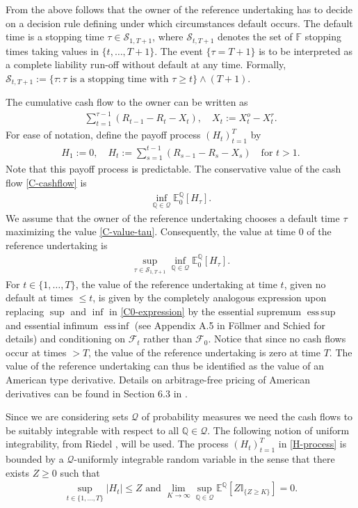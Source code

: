 \documentclass[11pt,a4paper]{article}
\newcommand{\E}{\mathbb{E}}
\DeclareMathOperator*{\esssup}{ess\,sup}
\DeclareMathOperator*{\essinf}{ess\,inf}
\newcommand{\Q}{\mathbb{Q}}
\newcommand{\calF}{\mathcal{F}}
\newcommand{\filF}{\mathbb{F}}
\newcommand{\calS}{\mathcal{S}}
\newcommand{\calQ}{\mathcal{Q}}
\newcommand{\indic}{\mathbb{I}}
\begin{document}
From the above follows that the owner of the reference undertaking has to decide on a decision rule defining under which circumstances default occurs. The default time is a stopping time $\tau \in \calS_{1,T+1}$, where $\calS_{t,T+1}$ denotes the set of $\filF$ stopping times taking values in $\{t,\dots,T+1\}$. The event $\{\tau=T+1\}$ is to be interpreted as a complete liability run-off without default at any time. Formally,
$\calS_{t,T+1}:=\{\tau : \tau \text{ is a stopping time with } \tau\geq t\} \wedge (T+1)$. 

The cumulative cash flow to the owner can be written as
\begin{align}
\sum_{t=1}^{\tau-1}(R_{t-1} - R_t -X_t), \quad X_t:=X^{o}_t-X^{r}_t. \label{C-cashflow}
\end{align}
For ease of notation, define the payoff process $(H_t)_{t=1}^T$ by 
\begin{align}
H_1:=0, \quad H_t:=\sum_{s=1}^{t-1}(R_{s-1} - R_s -X_s) \quad\text{for } t>1.\label{H-process}
\end{align}
Note that this payoff process is predictable. The conservative value of the cash flow \eqref{C-cashflow} is 
\begin{align}
\inf_{\Q \in \calQ}\E_0^{\Q}[H_\tau]. \label{C-value-tau}
\end{align}
We assume that the owner of the reference undertaking chooses a default time $\tau$ maximizing the value \eqref{C-value-tau}. Consequently, the value at time $0$ of the reference undertaking is 
\begin{align}\label{C0-expression}
\sup_{\tau \in \mathcal{S}_{1,T+1}}\inf_{\Q \in \calQ}\E_0^{\Q}[H_\tau].
\end{align}
For $t\in\{1,\dots,T\}$, the value of the reference undertaking at time $t$, given no default at times $\leq t$, is given by the completely analogous expression upon replacing $\sup$ and $\inf$ in \eqref{C0-expression} by the essential supremum $\esssup$ and essential infimum $\essinf$ (see Appendix A.5 in F\"ollmer and Schied \cite{Foellmer-Schied-16} for details) and conditioning on $\calF_t$ rather than $\calF_0$. 
Notice that since no cash flows occur at times $>T$, the value of the reference undertaking is zero at time $T$.
The value of the reference undertaking can thus be identified as the value of an American type derivative. Details on arbitrage-free pricing of American derivatives can be found in Section 6.3 in \cite{Foellmer-Schied-16}. 

Since we are considering sets $\calQ$ of probability measures we need the cash flows to be suitably integrable with respect to all $\Q\in\calQ$. The following notion of uniform integrability, from Riedel \cite{Riedel-09}, will be used.  
The process $(H_t)_{t=1}^T$ in \eqref{H-process} is bounded by a $\calQ$-uniformly integrable random variable in the sense that there exists $Z\geq 0$ such that  
\begin{align}\label{eq:H-uniformly-bounded}
\sup_{t\in\{1,\dots,T\}} |H_t|\leq Z
\text{ and }
\lim_{K\to\infty}\sup_{\Q\in\calQ}\E^{\Q}[Z\indic_{\{Z\geq K\}}]=0.
\end{align}   
\end{document}
